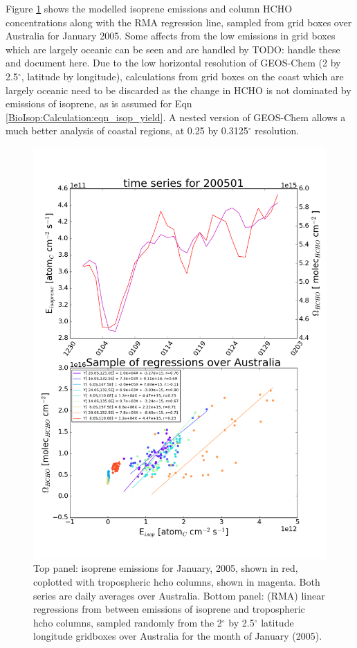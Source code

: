     Figure \ref{BioIsop:Calculation:fig_E_isop_vs_hcho_model_sample} shows the modelled isoprene emissions and column HCHO concentrations along with the RMA regression line, sampled from grid boxes over Australia for January 2005.
    Some affects from the low emissions in grid boxes which are largely oceanic can be seen and are handled by TODO: handle these and document here.
    Due to the low horizontal resolution of GEOS-Chem (2 by 2.5$^{\circ}$, latitude by longitude), calculations from grid boxes on the coast which are largely oceanic need to be discarded as the change in HCHO is not dominated by emissions of isoprene, as is assumed for Eqn \ref{BioIsop:Calculation:eqn_isop_yield}.
    A nested version of GEOS-Chem allows a much better analysis of coastal regions, at 0.25 by 0.3125$^{\circ}$ resolution.
    \begin{figure}[!htbp]
      \includegraphics[width=\textwidth]{Figures/Isoprene/E_isop_vs_hcho_series_200501.png}
      \caption{%
        Top panel: isoprene emissions for January, 2005, shown in red, coplotted with tropospheric hcho columns, shown in magenta.
        Both series are daily averages over Australia.
        Bottom panel: (RMA) linear regressions from between emissions of isoprene and tropospheric hcho columns, sampled randomly from the 2$^{\circ}$ by 2.5$^{\circ}$ latitude longitude gridboxes over Australia for the month of January (2005).
      }
      \label{BioIsop:Calculation:fig_E_isop_vs_hcho_model_sample}
    \end{figure}
    
